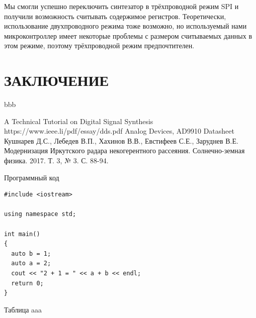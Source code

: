 \documentclass[rusmathsym, eqnumwithinsec, amspack, hyperref]{bomgost}
\begin{document}
Мы смогли успешно переключить синтезатор в трёхпроводной режим SPI и получили возможность считывать содержимое регистров. Теоретически, использование двухпроводного режима тоже возможно, но используемый нами микроконтроллер имеет некоторые проблемы с размером считываемых данных в этом режиме, поэтому трёхпроводной режим предпочтителен.

\section*{ЗАКЛЮЧЕНИЕ}
bbb

\begin{thebibliography}{11}
 A Technical Tutorial
on Digital Signal Synthesis https://www.ieee.li/pdf/essay/dds.pdf
 Analog Devices, AD9910 Datasheet
 Кушнарев Д.С., Лебедев В.П., Хахинов В.В., Евстифеев С.Е., Заруднев В.Е. Модернизация Иркутского радара некогерентного рассеяния. Солнечно-земная физика. 2017. Т. 3, № 3. С. 88-94.
\end{thebibliography}

\appendix

\begin{gostappendix}{Программный код}
\lstset{language=[11]c++,basicstyle=\ttfamily, showstringspaces=false}

\begin{lstlisting}
#include <iostream>

using namespace std;

int main()
{
  auto b = 1;
  auto a = 2;
  cout << "2 + 1 = " << a + b << endl;
  return 0;
}
\end{lstlisting}
\end{gostappendix}


\begin{gostappendix}{Таблица}
aaa
\end{gostappendix}
\end{document}
